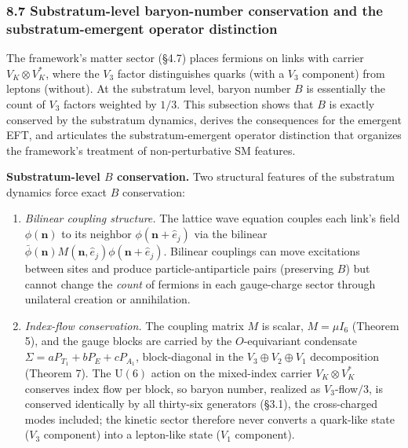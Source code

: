\documentclass[
]{article}
\begin{document}
\hypertarget{substratum-level-baryon-number-conservation-and-the-substratum-emergent-operator-distinction}{%
\subsubsection{8.7 Substratum-level baryon-number conservation and the
substratum-emergent operator
distinction}\label{substratum-level-baryon-number-conservation-and-the-substratum-emergent-operator-distinction}}

The framework's matter sector (§4.7) places fermions on links with
carrier \(V_K \otimes V_K^*\), where the \(V_3\) factor distinguishes
quarks (with a \(V_3\) component) from leptons (without). At the
substratum level, baryon number \(B\) is essentially the count of
\(V_3\) factors weighted by \(1/3\). This subsection shows that \(B\) is
exactly conserved by the substratum dynamics, derives the consequences
for the emergent EFT, and articulates the substratum-emergent operator
distinction that organizes the framework's treatment of non-perturbative
SM features.

\textbf{Substratum-level \(B\) conservation.} Two structural features of
the substratum dynamics force exact \(B\) conservation:

\begin{enumerate}
\def\labelenumi{(\roman{enumi})}
\item
  \emph{Bilinear coupling structure.} The lattice wave equation couples
  each link's field \(\phi(\mathbf{n})\) to its neighbor
  \(\phi(\mathbf{n} + \hat{e}_j)\) via the bilinear
  \(\bar{\phi}(\mathbf{n}) M(\mathbf{n}, \hat{e}_j) \phi(\mathbf{n} + \hat{e}_j)\).
  Bilinear couplings can move excitations between sites and produce
  particle-antiparticle pairs (preserving \(B\)) but cannot change the
  \emph{count} of fermions in each gauge-charge sector through
  unilateral creation or annihilation.
\item
  \emph{Index-flow conservation.} The coupling matrix \(M\) is scalar,
  \(M = \mu I_6\) (Theorem 5), and the gauge blocks are carried by the
  \(O\)-equivariant condensate \(\Sigma = aP_{T_1} + bP_E + cP_{A_1}\),
  block-diagonal in the \(V_3 \oplus V_2 \oplus V_1\) decomposition
  (Theorem 7). The \(\mathrm{U}(6)\) action on the mixed-index carrier
  \(V_K \otimes V_K^*\) conserves index flow per block, so baryon
  number, realized as \(V_3\)-flow\(/3\), is conserved identically by
  all thirty-six generators (§3.1), the cross-charged modes included;
  the kinetic sector therefore never converts a quark-like state
  (\(V_3\) component) into a lepton-like state (\(V_1\) component).
\end{enumerate}
\end{document}
